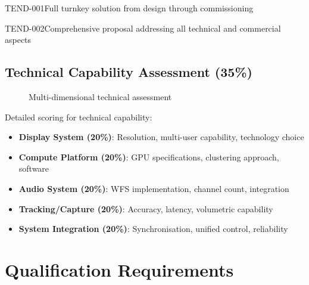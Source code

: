 \begin{requirement}{TEND-001}{Full turnkey solution from design through commissioning}
\begin{requirement}{TEND-002}{Comprehensive proposal addressing all technical and commercial aspects}
\subsection{Technical Capability Assessment (35\%)}

\begin{figure}[H]
\centering
{}
\caption{Multi-dimensional technical assessment}
\end{figure}

Detailed scoring for technical capability:

\begin{itemize}
    \item \textbf{Display System (20\%)}: Resolution, multi-user capability, technology choice
    \item \textbf{Compute Platform (20\%)}: GPU specifications, clustering approach, software
    \item \textbf{Audio System (20\%)}: WFS implementation, channel count, integration
    \item \textbf{Tracking/Capture (20\%)}: Accuracy, latency, volumetric capability
    \item \textbf{System Integration (20\%)}: Synchronisation, unified control, reliability
\end{itemize}

\section{Qualification Requirements}


\end{requirement}
\end{requirement}
